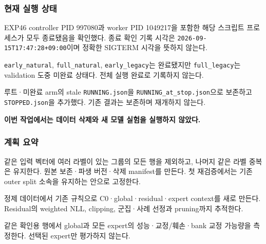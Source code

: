 \subsubsection{현재 실행 상태}
\par\noindent \textbullet\enspace EXP46 controller PID 997080과 worker PID 1049217을 포함한 해당 스크립트 프로세스가 모두 종료됐음을 확인했다. 종료 확인 기록 시각은 \texttt{2026-\allowbreak{}09-\allowbreak{}15T17:47\allowbreak{}:28+\allowbreak{}\allowbreak{}09:0\allowbreak{}0}이며 정확한 SIGTERM 시각을 뜻하지 않는다.


\par\noindent \textbullet\enspace \texttt{early\_\allowbreak{}\allowbreak{}na\allowbreak{}tural}, \texttt{full\_\allowbreak{}\allowbreak{}nat\allowbreak{}ural}, \texttt{early\_\allowbreak{}\allowbreak{}le\allowbreak{}gacy}는 완료됐지만 \texttt{full\_\allowbreak{}\allowbreak{}leg\allowbreak{}acy}는 validation 도중 미완료 상태다. 전체 실행 완료로 기록하지 않는다.


\par\noindent \textbullet\enspace 루트·미완료 arm의 stale \texttt{RUNNING.\allowbreak{}json}을 \texttt{RUNNING\_\allowbreak{}\allowbreak{}at\_\allowbreak{}\allowbreak{}stop.\allowbreak{}json}으로 보존하고 \texttt{STOPPED.\allowbreak{}json}을 추가했다. 기존 결과는 보존하며 재개하지 않는다.


\par\noindent \textbullet\enspace \textbf{이번 작업에서는 데이터 삭제와 새 모델 실험을 실행하지 않았다.}


\subsubsection{계획 요약}
\par\noindent \textbullet\enspace 같은 입력 벡터에 여러 라벨이 있는 그룹의 모든 행을 제외하고, 나머지 같은 라벨 중복은 유지한다. 원본 보존·파생 버전·삭제 manifest를 만든다. 첫 재검증에서는 기존 outer split 소속을 유지하는 안으로 고정한다.


\par\noindent \textbullet\enspace 정제 데이터에서 기존 규칙으로 C0·global·residual·expert context를 새로 만든다. Residual의 weighted NLL, clipping, 군집·사례 선정과 pruning까지 추적한다.


\par\noindent \textbullet\enspace 같은 확인용 행에서 global과 모든 expert의 성능·교정/\allowbreak{}훼손·bank 교정 가능량을 측정한다. 선택된 expert만 평가하지 않는다.


